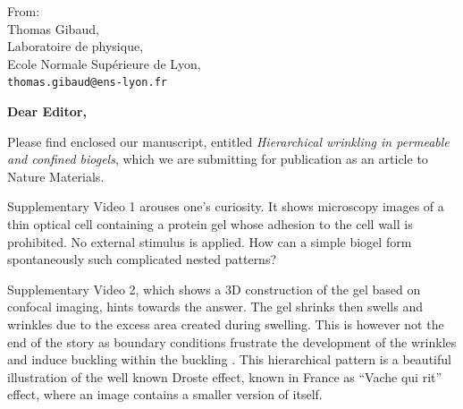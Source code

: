 \documentclass[a4paper, parskip=true, firsthead=false, fromemail=true, foldmarks=false]{scrlttr2}
\begin{document}
\begin{letter}{From:\\
Thomas Gibaud,\\
Laboratoire de physique,\\
Ecole Normale Supérieure de Lyon,\\
\texttt{thomas.gibaud@ens-lyon.fr}
}
\opening{\bf Dear Editor,}

Please find enclosed our manuscript, entitled \emph{Hierarchical wrinkling in permeable and confined biogels}, which we are submitting for publication as an article to Nature Materials.



Supplementary Video 1 arouses one's curiosity. It shows microscopy images of a thin optical cell containing a protein gel whose adhesion to the cell wall is prohibited. No external stimulus is applied. How can a simple biogel form spontaneously such complicated nested patterns?

Supplementary Video 2, which shows a 3D construction of the gel based on confocal imaging, hints towards the answer. The gel shrinks then swells and wrinkles due to the excess area created during swelling. This is however not the end of the story as boundary conditions frustrate the development of the wrinkles and induce buckling within the buckling . This hierarchical pattern is a beautiful illustration of the well known Droste effect, known in France as ``Vache qui rit'' effect, where an image contains a smaller version of itself.



\end{letter}
\end{document}
